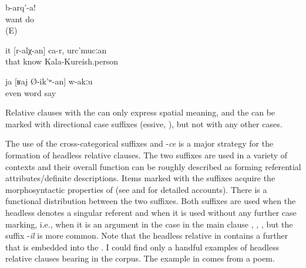 \begin{exe}
	\ex	\label{ex:Do what you want}
	\gll	[at	b-ikː-an]	b-arq'-a!\\
			want	do\\
	\glt	{} (E)

	\ex	\label{ex:She is the one who I know, from Kala-Kureish}
	\gll	it	[r-alχ-an]	ca-r,	urc'mucːan\\
		that	know		Kala-Kureish.person\\
	\glt	{}

	\ex	\label{ex:There is even nobody who is talking.}
	\gll	ja	[ʁaj	Ø-ik'ʷ-an]	w-akːu\\
		even	word	say	\\
	\glt	{}
\end{exe}

Relative clauses with the  can only express spatial meaning, and the  can be marked with directional case suffixes (essive, ), but not with any other cases.

The use of the cross-categorical suffixes  and -\textit{ce} is a major strategy for the formation of headless relative clauses. The two suffixes are used in a variety of contexts and their overall function can be roughly described as forming referential attributes\slash definite descriptions. Items marked with the suffixes acquire the morphosyntactic properties of  (see  and  for detailed accounts). There is a functional distribution between the two suffixes. Both suffixes are used when the headless  denotes a singular referent and when it is used without any further case marking, i.e., when it is an argument in the  case in the main clause  , , , but the suffix -\textit{il} is more common. Note that the headless relative in  contains a further  that is embedded into the . I could find only a handful examples of headless relative clauses bearing  in the corpus. The example in  comes from a poem.  


